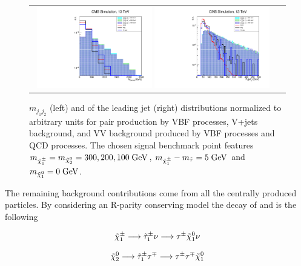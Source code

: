 \begin{figure}[tbh!]
	\centering
	\begin{tabular}{cc}
		\includegraphics[width=0.48\textwidth]{analysis/pics/h_dijetinvariantmass_prospects13tev.pdf}
		\includegraphics[width=0.48\textwidth]{analysis/pics/h_jet1pt_prospects13tev.pdf} 		
	\end{tabular}
	\caption{\ensuremath{m_{j_{1}j_{2}}} (left) and \pt of the leading jet (right) distributions normalized to arbitrary units for \charginopm \charginopm pair production by VBF processes, V+jets background, and VV background produced by VBF processes and QCD processes. The chosen signal benchmark point features \ensuremath{m_{\charginopm} = m_{\neutralinotwo} = 300, 200, 100\gev}, \ensuremath{m_{\charginopm} - m_{\tilde{\tau}} = 5\gev} and \ensuremath{m_{\neutralinoone} = 0\gev}.}
	\label{fig:VBF_mjj_ptj1}
\end{figure}


The remaining background contributions come from all the centrally produced particles. By considering an R-parity conserving model the decay of \charginopm and \neutralinotwo is the following

\begin{equation}
 \tilde{\chi}^{\pm}_{1} \longrightarrow \tilde{\tau}_{1}^{\pm} \nu \longrightarrow \tau^{\pm} \tilde{\chi}^{0}_{1} \nu
\end{equation}

\begin{equation}
\tilde{\chi}^{0}_{2} \longrightarrow \tilde{\tau}_{1}^{\pm} \tau^{\mp} \longrightarrow \tau^{\pm} \tau^{\mp} \tilde{\chi}^{0}_{1}
\end{equation}

